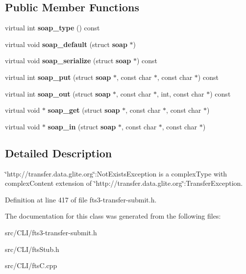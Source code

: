 \subsection*{Public Member Functions}
\begin{DoxyCompactItemize}
\item 
virtual int {\bfseries soap\_\-type} () const \label{classtransfer____NotExistsException_a81787f77cb069acf938460e5c6c9f7cc}

\item 
virtual void {\bfseries soap\_\-default} (struct {\bf soap} $\ast$)\label{classtransfer____NotExistsException_ae8aec49cc33ebc4bc7084c08ab3cbd6f}

\item 
virtual void {\bfseries soap\_\-serialize} (struct {\bf soap} $\ast$) const \label{classtransfer____NotExistsException_a91e1dc82a7f3f0dc759a709e33b50a19}

\item 
virtual int {\bfseries soap\_\-put} (struct {\bf soap} $\ast$, const char $\ast$, const char $\ast$) const \label{classtransfer____NotExistsException_a52bee29e71eeb837d717717a4da0e96c}

\item 
virtual int {\bfseries soap\_\-out} (struct {\bf soap} $\ast$, const char $\ast$, int, const char $\ast$) const \label{classtransfer____NotExistsException_ada44a95281a7f9759ed32a83bcb953aa}

\item 
virtual void $\ast$ {\bfseries soap\_\-get} (struct {\bf soap} $\ast$, const char $\ast$, const char $\ast$)\label{classtransfer____NotExistsException_a76ab93e4b37c61e2748ce66a5ee57965}

\item 
virtual void $\ast$ {\bfseries soap\_\-in} (struct {\bf soap} $\ast$, const char $\ast$, const char $\ast$)\label{classtransfer____NotExistsException_ada347ffb0653a04752a3de024d266af7}

\end{DoxyCompactItemize}


\subsection{Detailed Description}
\char`\"{}http://transfer.data.glite.org\char`\"{}:NotExistsException is a complexType with complexContent extension of \char`\"{}http://transfer.data.glite.org\char`\"{}:TransferException. 

Definition at line 417 of file fts3-\/transfer-\/submit.h.



The documentation for this class was generated from the following files:\begin{DoxyCompactItemize}
\item 
src/CLI/fts3-\/transfer-\/submit.h\item 
src/CLI/ftsStub.h\item 
src/CLI/ftsC.cpp\end{DoxyCompactItemize}
